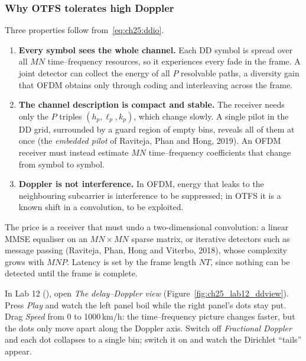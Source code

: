 \subsubsection{Why OTFS tolerates high Doppler}
Three properties follow from~\eqref{eq:ch25:ddio}.
\begin{enumerate}
\item \textbf{Every symbol sees the whole channel.} Each DD symbol is spread over all $MN$
time--frequency resources, so it experiences every fade in the frame. A joint detector can collect
the energy of all $P$ resolvable paths, a diversity gain that OFDM obtains only through coding and
interleaving across the frame.
\item \textbf{The channel description is compact and stable.} The receiver needs only the $P$ triples
$(h_p,\ell_p,k_p)$, which change slowly. A single pilot in the DD grid, surrounded by a guard region
of empty bins, reveals all of them at once (the \emph{embedded pilot} of Raviteja, Phan and Hong,
2019). An OFDM receiver must instead estimate $MN$ time--frequency coefficients that change from
symbol to symbol.
\item \textbf{Doppler is not interference.} In OFDM, energy that leaks to the neighbouring subcarrier
is interference to be suppressed; in OTFS it is a known shift in a convolution, to be exploited.
\end{enumerate}
The price is a receiver that must undo a two-dimensional convolution: a linear MMSE equaliser on an
$MN\times MN$ sparse matrix, or iterative detectors such as message passing (Raviteja, Phan, Hong and
Viterbo, 2018), whose complexity grows with $MNP$. Latency is set by the frame length $NT$, since
nothing can be detected until the frame is complete.

\begin{tryit}
In Lab 12 (), open \emph{The delay--Doppler view}
(Figure~\ref{fig:ch25_lab12_ddview}). Press \emph{Play} and watch the left panel boil while the
right panel's dots stay put. Drag \emph{Speed} from 0 to 1000\,km/h: the time--frequency picture
changes faster, but the dots only move apart along the Doppler axis. Switch off \emph{Fractional
Doppler} and each dot collapses to a single bin; switch it on and watch the Dirichlet ``tails''
appear.
\end{tryit}


